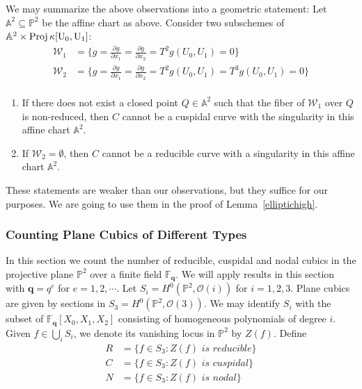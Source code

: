 \documentclass[12pt]{article}
\theoremstyle{plain}
\theoremstyle{definition}
\newcommand{\IA}{\mathbb{A}}
\newcommand{\IF}{\mathbb{F}}
\newcommand{\IP}{\mathbb{P}}
\newcommand{\sO}{\mathcal{O}}
\newcommand{\Proj}{\rm Proj\,}
\newcommand\union{\bigcup}
\newcommand{\<}{\langle}
\renewcommand{\>}{\rangle}
\newcommand{\p}{\partial}
\newcommand{\sW}{\mathcal{W}}
\begin{document}
We may summarize the above observations into a geometric statement: Let $\IA^2 \subseteq \IP^2$ be the affine chart as above. Consider two subschemes of $\IA^2 \times \Proj \kappa[U_0, U_1]$: 
\begin{align*}
\sW_1 &= \{ g = \frac{\p g}{\p x_1} = \frac{\p g}{\p x_2} = T^2 g(U_0, U_1) = 0 \} \\
\sW_2 &= \{ g = \frac{\p g}{\p x_1} = \frac{\p g}{\p x_2} = T^2 g(U_0, U_1) = T^3 g(U_0, U_1) = 0 \} \\
\end{align*} 
\begin{enumerate}
\item If there does not exist a closed point $Q \in \IA^2$ such that the fiber of $\sW_1$ over $Q$ is non-reduced, then $C$ cannot be a cuspidal curve with the singularity in this affine chart $\IA^2$. 
\item If $\sW_2 = \emptyset$, then $C$ cannot be a reducible curve with a singularity in this affine chart $\IA^2$. 
\end{enumerate}
These statements are weaker than our observations, but they suffice for our purposes. We are going to use them in the proof of Lemma~\ref{elliptichigh}. 


\subsubsection{Counting Plane Cubics of Different Types}
In this section we count the number of reducible, cuspidal and nodal cubics in the projective plane $\IP^2$ over a finite field $\IF_{\pmb{q}}$. We will apply results in this section with $\pmb{q} = q^e$ for $e = 1, 2, \cdots$. Let $S_i = H^0(\IP^2, \sO(i))$ for $i = 1,2,3$. Plane cubics are given by sections in $S_3 = H^0(\IP^2, \sO(3))$. We may identify $S_i$ with the subset of $\IF_{\pmb{q}}[X_0, X_1, X_2]$ consisting of homogeneous polynomials of degree $i$. Given $f \in \union_i S_i$, we denote its vanishing locus in $\IP^2$ by $Z(f)$. Define 
\begin{align*}
R &= \{ f \in S_3 : Z(f) \textit{ is reducible} \} \\
C &= \{ f \in S_3 : Z(f) \textit{ is cuspidal} \} \\
N &= \{ f \in S_3 : Z(f) \textit{ is nodal} \}
\end{align*}
\end{document}
